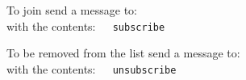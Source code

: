 \smallskip\noindent
To join send a message to: 
\\
with the contents:~~\texttt{ subscribe }


\smallskip\noindent
To be removed from the list send a message to: 
\\
with the contents:~~\texttt{ unsubscribe }




